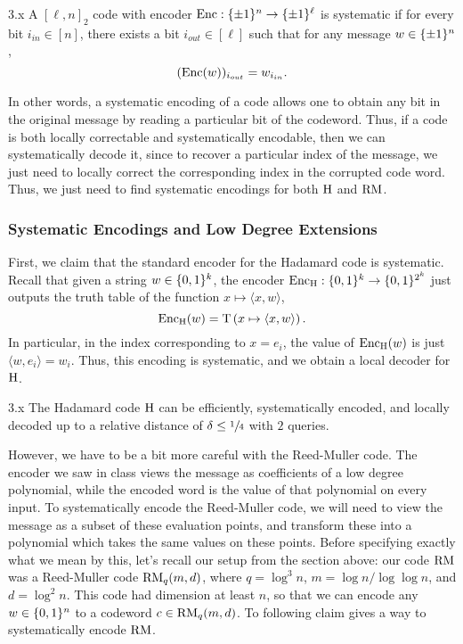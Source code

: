 \documentclass[11pt]{article}
\begin{document}
\begin{definition}{3.x}
    A $[\ell, n]_2$  code with encoder $\mathrm{Enc} : \{\pm 1\}^{n} \rightarrow \{\pm 1\}^{\ell}$ is systematic if for every bit $i_{in} \in [n]$, there exists a bit $i_{out} \in [\ell]$ such that for any message $w \in \{\pm 1\}^n$, 
    \begin{equation*}
        (\mathrm{Enc}(w))_{i_{out}} = w_{i_{in}}.
    \end{equation*}
\end{definition}

In other words, a systematic encoding of a code allows one to obtain any bit in the original message by reading a particular bit of the codeword. Thus, if a code is both locally correctable and systematically encodable, then we can systematically decode it, since to recover a particular index of the message, we just need to locally correct the corresponding index in the corrupted code word. Thus, we just need to find systematic encodings for both $\mathrm{H}$ and $\mathrm{RM}$.

\subsubsection{Systematic Encodings and Low Degree Extensions}

First, we claim that the standard encoder for the Hadamard code is systematic. Recall that given a string $w \in \{0, 1\}^k$, the encoder $\mathrm{Enc}_{\mathrm{H}} : \{0, 1\}^k \rightarrow \{0, 1\}^{2^k}$ just outputs the truth table of the function $x \mapsto \langle x, w \rangle$,
\begin{equation*}
    \mathrm{Enc}_{\mathrm{H}} (w) = \mathrm{T}\left(x \mapsto \langle x, w \rangle\right).
\end{equation*}
In particular, in the index corresponding to $x = e_i$, the value of $\mathrm{Enc}_{\mathrm{H}}(w)$ is just $\langle w, e_i \rangle = w_i$. Thus, this encoding is systematic, and we obtain a local decoder for $\mathrm{H}$.

\begin{claim}{3.x}
    The Hadamard code $\mathrm{H}$ can be efficiently, systematically encoded, and locally decoded up to a relative distance of $\delta \leq \sfrac{1}{4}$ with $2$ queries.
\end{claim}

However, we have to be a bit more careful with the Reed-Muller code. The encoder we saw in class views the message as coefficients of a low degree polynomial, while the encoded word is the value of that polynomial on every input. To systematically encode the Reed-Muller code, we will need to view the message as a subset of these evaluation points, and transform these into a polynomial which takes the same values on these points. Before specifying exactly what we mean by this, let's recall our setup from the section above: our code $\mathrm{RM}$ was a Reed-Muller code $\mathrm{RM}_q(m, d)$, where $q = \log^3 n$, $m = \log n / \log \log n$, and $d = \log^2 n$. This code had dimension at least $n$, so that we can encode any $w \in \{0, 1\}^n$ to a codeword $c \in \mathrm{RM}_q(m, d)$. To following claim gives a way to systematically encode $\mathrm{RM}$.
\end{document}
